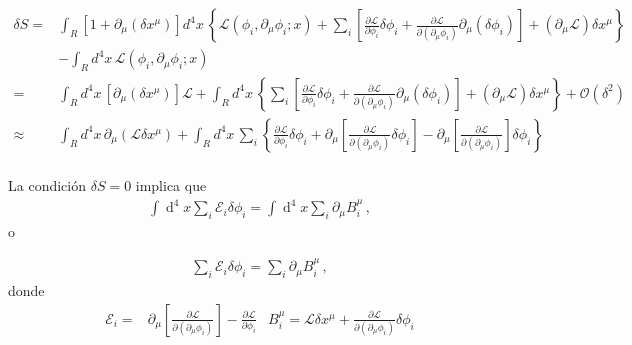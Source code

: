 \begin{align}
     \delta S =&\int_{R} \left[ 1+\partial_{\mu} \left( \delta x^{\mu}  \right)\right]  d^4x\,\left\{ \mathcal{L}(\phi_i,\partial_{\mu}\phi_i;x)+\sum_i \left[ \frac{\partial\mathcal{L}}{\partial\phi_i}\delta\phi_{i} +\frac{\partial\mathcal{L}}{\partial(\partial_{\mu}\phi_i)}\partial_{\mu}(\delta\phi_{i}) \right]+\left( \partial_{\mu}\mathcal{L} \right)\delta x^{\mu} \right\}\nonumber\\
      &- \int_{R}d^4x\,\mathcal{L} \left( \phi_{i},\partial_{\mu}\phi_i;x \right) \nonumber\\
     =&\int_{R} d^4x\,\left[ \partial_{\mu} \left( \delta x^{\mu}  \right)\right] \mathcal{L} + \int_{R}d^4x\,\left\{\sum_i \left[ \frac{\partial\mathcal{L}}{\partial\phi_i}\delta\phi_{i} +\frac{\partial\mathcal{L}}{\partial(\partial_{\mu}\phi_i)}\partial_{\mu}(\delta\phi_{i}) \right]+\left( \partial_{\mu}\mathcal{L} \right)\delta x^{\mu} \right\}+\mathcal{O} \left( \delta^2 \right)\nonumber\\
     \approx&\int_{R} d^4x\,\partial_{\mu} \left(\mathcal{L} \delta x^{\mu}  \right)  + \int_{R}d^4x\,\sum_i \left\{ \frac{\partial\mathcal{L}}{\partial\phi_i}\delta\phi_{i} +\partial_{\mu} \left[ \frac{\partial\mathcal{L}}{\partial(\partial_{\mu}\phi_i)}\delta\phi_{i} \right]-\partial_{\mu} \left[ \frac{\partial\mathcal{L}}{\partial(\partial_{\mu}\phi_i)}\right]\delta\phi_{i}  \right\}\nonumber\\
\end{align}
\begin{frame}
La condición $\delta S=0$ implica que
\begin{align}
\label{eq:masterint}
\int \operatorname{d}^4x  \sum_i \mathcal{E}_i \delta\phi_i =\int \operatorname{d}^4x \sum_i \partial_{\mu} B^{\mu}_{i}\,,
\end{align}
o

\begin{align}
  \sum_i \mathcal{E}_i \delta\phi_i = \sum_i \partial_{\mu} B^{\mu}_{i}\,,
\end{align}
donde
\begin{align}
\label{eq:master2}
  \mathcal{E}_i=&\partial_{\mu} \left[ \frac{\partial\mathcal{L}}{\partial(\partial_{\mu}\phi_i)}\right]-\frac{\partial\mathcal{L}}{\partial\phi_i} & B^{\mu}_i=\mathcal{L} \delta x^{\mu} + \frac{\partial\mathcal{L}}{\partial(\partial_{\mu}\phi_i)}\delta\phi_{i} 
\end{align}
\end{frame}



